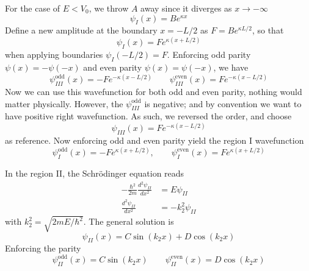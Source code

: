 \documentclass[../../../main.tex]{subfiles}
\begin{document}
For the case of $E<V_0$, we throw $A$ away since it diverges as $x \rightarrow -\infty$
\begin{equation*}
    \psi_{I}(x) = B e^{\kappa x}
\end{equation*}
Define a new amplitude at the boundary \(x = -L/2\) as $F = B e^{\kappa L/2}$, so that
\begin{equation*}
    \psi_{I}(x) = F e^{\kappa (x + L/2)}
\end{equation*}
when applying boundaries $\psi_{I}(-L/2) = F$.
Enforcing odd parity $\psi(x)=-\psi(-x)$ and even  parity $\psi(x)=\psi(-x)$, we have
\begin{equation*}
    \psi_{III}^{\text{odd}}(x) = -F e^{-\kappa (x - L/2)}
    \qquad
    \psi_{III}^{\text{even}}(x) = F e^{-\kappa (x - L/2)}
\end{equation*}
Now we can use this wavefunction for both odd and even parity, nothing would matter physically.
However, the $\psi_{III}^{\text{odd}}$ is negative; and by convention we want to have positive right wavefunction.
As such, we reversed the order, and choose
\begin{equation*}
    \psi_{III}(x) = F e^{-\kappa (x - L/2)}
\end{equation*}
as reference.
Now enforcing odd and even parity yield the region I wavefunction
\begin{equation*}
    \psi_{I}^{\text{odd}}(x) = -F e^{\kappa (x + L/2)},
    \qquad
    \psi_{I}^{\text{even}}(x) = F e^{\kappa (x + L/2)}
\end{equation*}

In the region II, the Schrödinger equation reads
\begin{align*}
    -\frac{\hbar^2}{2 m} \frac{d^2 \psi_{II}}{dx^2} & =  E \psi_{II}      \\
    \frac{d^2 \psi_{II}}{dx^2}                      & = - k_2^2 \psi_{II}
\end{align*}
with $k_2^2=\sqrt{2mE/\hbar^2}$.
The general solution is
\begin{equation*}
    \psi_{II}(x)=C\sin (k_2x)+D \cos (k_2x)
\end{equation*}
Enforcing the parity
\begin{equation*}
    \psi_{II}^{\text{odd}}(x) = C \sin (k_2x)
    \qquad
    \psi_{II}^{\text{even}}(x) =  D \cos (k_2x)
\end{equation*}
\end{document}
